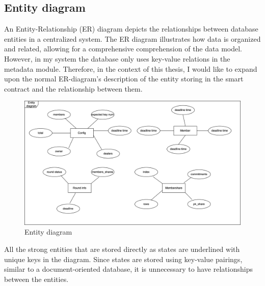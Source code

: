 \documentclass[../Main.tex]{subfiles}
\begin{document}
\subsection{Entity diagram}
An Entity-Relationship (ER) diagram depicts the relationships between database entities in a centralized system. The ER diagram illustrates how data is organized and related, allowing for a comprehensive comprehension of the data model. However, in my system the database only uses key-value relations in the metadata module. Therefore, in the context of this thesis, I would like to expand upon the normal ER-diagram's description of the entity storing in the smart contract and the relationship between them.
\begin{figure}[H]
 \centering
 \includegraphics[scale=0.13]{Figure/entity-diagram.png}
 \caption{Entity diagram}
    \label{fig:entity-diagram}
\end{figure}
All the strong entities that are stored directly as states are underlined with unique keys in the diagram. Since states are stored using key-value pairings, similar to a document-oriented database, it is unnecessary to have relationships between the entities.\\
\end{document}
